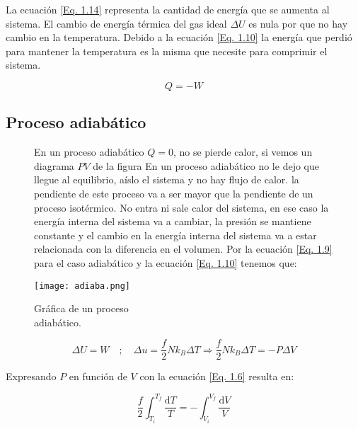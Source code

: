 \documentclass[11pt,fleqn]{book}
\begin{document}
La ecuación \ref{Eq. 1.14} representa la cantidad de energía que se aumenta al sistema. El cambio de energía térmica del gas ideal $\Delta U$ es nula por que no hay cambio en la temperatura. Debido a la ecuación \ref{Eq. 1.10} la energía que perdió para mantener la temperatura es la misma que necesite para comprimir el sistema.

\begin{equation}
    Q=-W
    \label{Eq. 1.15}
\end{equation}

\subsection{Proceso adiabático}

\begin{figure}[H]
    \begin{minipage}[c]{0.55\linewidth}
    \hspace{5mm} En un proceso adiabático $Q=0$, no se pierde calor, si vemos un diagrama $PV$ de la figura En un proceso adiabático no le dejo que llegue al equilibrio, aíslo el sistema y no hay flujo de calor. la pendiente de este proceso va a ser mayor que la pendiente de un proceso isotérmico. No entra ni sale calor del sistema, en ese caso la energía interna del sistema va a cambiar, la presión se mantiene constante y el cambio en la energía interna del sistema va a estar relacionada con la diferencia en el volumen. Por la ecuación \ref{Eq. 1.9} para el caso adiabático y la ecuación \ref{Eq. 1.10} tenemos que:
    \end{minipage}\hspace{5mm}
    \begin{minipage}[c]{0.5\linewidth}
    \texttt{[image: adiaba.png]}
    \caption{Gráfica de un proceso\\ adiabático.}
    \label{Fig. 1.6}
    \end{minipage}
\end{figure}
\vspace{-7mm}

\begin{equation*}
    \Delta U=W\quad;\quad\Delta u=\frac{f}{2}Nk_{B}\Delta T\Longrightarrow\frac{f}{2}Nk_{B}\Delta T=-P\Delta V
\end{equation*}

Expresando $P$ en función de $V$ con la ecuación \ref{Eq. 1.6} resulta en:

\begin{equation*}
    \frac{f}{2}\int_{T_{i}}^{T_{f}}\frac{\mathrm{d}T}{T}=-\int_{V_{i}}^{V_{f}}\frac{\mathrm{d}V}{V}
\end{equation*}
\end{document}
